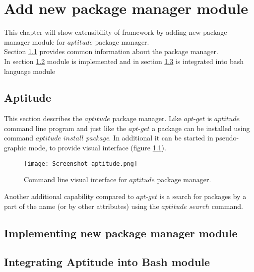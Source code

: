 
\chapter{Add new package manager module}\label{chap:add}
This chapter will show extensibility of framework by adding new package manager module for $aptitude$ package manager.\\
Section \ref{sec:aptitude} provides common information about the package manager.\\
In section \ref{sec:aptitude_imp} module is implemented and in section \ref{sec:aptitude_int} is integrated into bash language module

\section{Aptitude}\label{sec:aptitude}
This section describes the $aptitude$ package manager.
Like $apt$-$get$ is $aptitude$ command line program and just like the $apt$-$get$ a package can be installed using command $aptitude$ $install$ \emph{package}. In additional it can be started in pseudo-graphic mode, to provide visual interface (figure \ref{fig:aptitude_gui}).
\begin{figure}[ht]   
	\centering
	\texttt{[image: Screenshot\_aptitude.png]}
	\caption{Command line visual interface for $aptitude$ package manager.}
	\label{fig:aptitude_gui}
\end{figure}
Another additional capability compared to $apt$-$get$ is a search for packages by a part of the name (or by other attributes) using the $aptitude$ $search$ command.
\section{Implementing new package manager module}\label{sec:aptitude_imp}
\section{Integrating Aptitude into Bash module}\label{sec:aptitude_int}